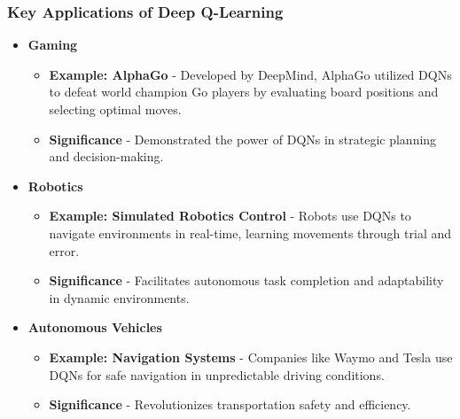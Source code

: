 \documentclass[aspectratio=169]{beamer}
\begin{document}
\begin{frame}[fragile]
    \frametitle{Key Applications of Deep Q-Learning}
    \begin{itemize}
        \item \textbf{Gaming}
        \begin{itemize}
            \item \textbf{Example: AlphaGo} - Developed by DeepMind, AlphaGo utilized DQNs to defeat world champion Go players by evaluating board positions and selecting optimal moves.
            \item \textbf{Significance} - Demonstrated the power of DQNs in strategic planning and decision-making.
        \end{itemize}
        
        \item \textbf{Robotics}
        \begin{itemize}
            \item \textbf{Example: Simulated Robotics Control} - Robots use DQNs to navigate environments in real-time, learning movements through trial and error.
            \item \textbf{Significance} - Facilitates autonomous task completion and adaptability in dynamic environments.
        \end{itemize}
        
        \item \textbf{Autonomous Vehicles}
        \begin{itemize}
            \item \textbf{Example: Navigation Systems} - Companies like Waymo and Tesla use DQNs for safe navigation in unpredictable driving conditions.
            \item \textbf{Significance} - Revolutionizes transportation safety and efficiency.
        \end{itemize}
    \end{itemize}
\end{frame}
\end{document}
